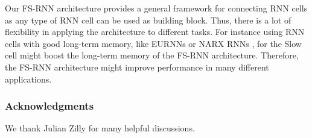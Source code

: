 \documentclass{article}
\begin{document}
Our FS-RNN architecture provides a general framework for connecting RNN cells as any type of RNN cell can be used as building block. Thus, there is a lot of flexibility in applying the architecture to different tasks. For instance using RNN cells with good long-term memory, like EURNNs \cite{jing2016EUNN} or NARX RNNs \cite{lin1996learning, narx2017}, for the Slow cell might boost the long-term memory of the FS-RNN architecture. Therefore, the FS-RNN architecture might improve performance in many different applications.









%
 


\subsubsection*{Acknowledgments}

We thank Julian Zilly for many helpful discussions.
















\begin{footnotesize}


\end{footnotesize}
\end{document}
